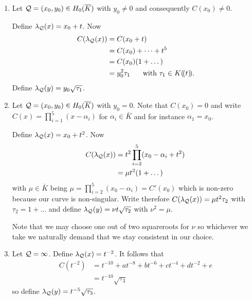 \documentclass[english,11pt,a4paper]{article}
\begin{document}
\begin{defin}
	\begin{enumerate}[1.]
		\item Let $\mathcal{Q} =(x_0,y_0) \in H_0(\overline K)$ with $y_0 \neq 0$ and consequently $C(x_0)\neq 0$.

		Define $\lambda_{\mathcal{Q}}(x) = x_0 + t$. Now
		\begin{align*}
		  C(\lpx) &= C(x_0+t)\\
		          &= C(x_0)+ \dots + t^5\\
		          &= C(x_0)(1 + \dots)\\ %
		          &= y_0^2 \tau_1 \text{\hspace{5mm} with } \tau_1 \in K (\! (t)\! ).
		\end{align*}
		Define $\lambda_{\mathcal{Q}}(y) = y_0 \sqrt{\tau_1}$.

		\item Let $\mathcal{Q} =(x_0,y_0) \in H_0(\overline K)$ with $y_0 = 0$.	Note that $C(x_0)=0$ and write $C(x)=\prod_{i=1}^5 (x-\alpha_i)$ for $\alpha_i \in \bar K$ and for instance $\alpha_1 = x_0$.

		Define $\lambda_{\mathcal{Q}}(x) = x_0 + t^2$. Now
		\begin{align*}
		  C(\lambda_{\mathcal{Q}}(x)) &= t^2 \prod_{i=2}^5 (x_0 -\alpha_i + t^2) \\
		          &= \mu t^2 (1 + \dots)
		\end{align*}
		with $\mu \in \bar K$ being $\mu = \prod_{i=2}^5 (x_0 - \alpha_i) = C'(x_0)$ which is non-zero because our curve is non-singular. Write therefore $C(\lambda_{\mathcal{Q}}(x)) = \mu t^2 \tau_2$ with $\tau_2 = 1 + \dots$ and define $\lambda_{\mathcal{Q}}(y) = \nu t \sqrt{\tau_2}$ with $\nu^2 = \mu$.

		Note that we may choose one out of two squareroots for $\nu$ so whichever we take we naturally demand that we stay consistent in our choice. %

		\item Let $\mathcal{Q} = \infty$. Define $\lambda_{\mathcal{Q}}(x) = t^{-2}$. It follows that
		\begin{align*}
			C(t^{-2}) &= t^{-10} + at^{-8} + bt^{-6}
											  + ct^{-4}    + dt^{-2} + e\\
											 &= t^{-10} \sqrt{\tau_3}
		\end{align*}
		so define $\lambda_{\mathcal{Q}}(y) = t^{-5} \sqrt{\tau_3}$.
	\end{enumerate}
\end{defin}
\end{document}
